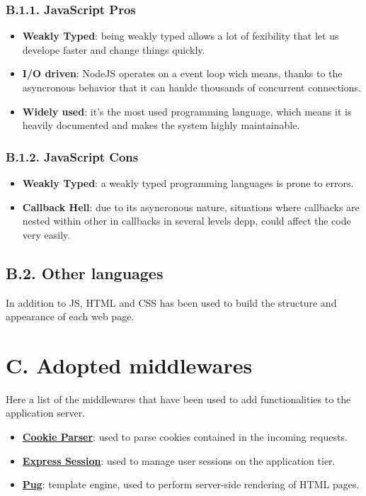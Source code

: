 \subsubsection{B.1.1. JavaScript Pros}

\begin{itemize}
  \item \textbf{Weakly Typed}: being weakly typed allows a lot of fexibility that let us develope faster and change things quickly.
  \item \textbf{I/O driven}: NodeJS operates on a event loop wich means, thanks to the asyncronous behavior that it can hanlde thousands of concurrent connections.
  \item \textbf{Widely used}: it's the most used programming language, which means it is heavily documented and makes the system highly maintainable.
\end{itemize}

\subsubsection{B.1.2. JavaScript Cons}

\begin{itemize}
  \item \textbf{Weakly Typed}: a weakly typed programming languages is prone to errors.
  \item \textbf{Callback Hell}: due to its asyncronous nature, situations where callbacks are nested within other in callbacks in several levels depp, could affect the code very easily.
\end{itemize}

\subsection{B.2. Other languages}

In addition to JS, HTML and CSS has been used to build the structure and appearance of each web page.

\section{C. Adopted middlewares}

Here a list of the middlewares that have been used to add functionalities to the application server.

\begin{itemize}
  \item \textbf{\href{https://www.npmjs.com/package/cookie-parser}{Cookie Parser}}: used to parse cookies contained in the incoming requests.
  \item \textbf{\href{https://www.npmjs.com/package/express-session}{Express Session}}: used to manage user sessions on the application tier.
  \item \textbf{\href{https://www.npmjs.com/package/pug}{Pug}}: template engine, used to perform server-side rendering of HTML pages.
\end{itemize}

